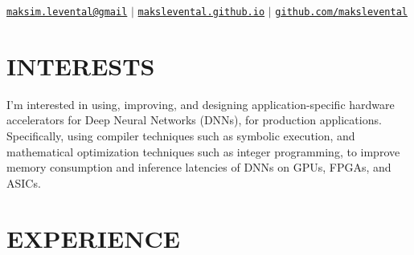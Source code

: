 \documentclass[11pt,letterpaper,roman,colorlinks,linkcolor=blue]{moderncv}
\newcommand*{\modern}{\fontfamily{qhv}\selectfont}
\newcommand{\mystyle}[1]{\textcolor{mygrey}{\modern #1}}
\newcommand{\mysectionstyle}[1]{\large\mystyle{#1}}
\begin{document}
\makecvtitle

\vspace{-16mm}
\begin{center}
\mystyle{\href{maksim.levental@gmail.com}{\texttt{maksim.levental@gmail}} $|$ \href{https://makslevental.github.io/}{\texttt{makslevental.github.io}} $|$ \href{https://github.com/makslevental}{\texttt{github.com/makslevental}}}
\end{center}


\section{\mysectionstyle{INTERESTS}}

I'm interested in using, improving, and designing application-specific hardware accelerators for Deep Neural Networks (DNNs), for production applications.
Specifically, using compiler techniques such as symbolic execution, and mathematical optimization techniques such as integer programming, to improve memory consumption and inference latencies of DNNs on GPUs, FPGAs, and ASICs. 


\section{\mysectionstyle{EXPERIENCE}}
\end{document}
